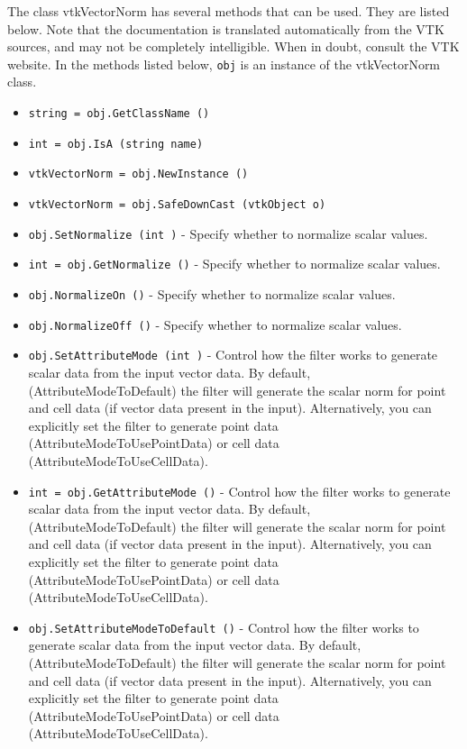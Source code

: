 The class vtkVectorNorm has several methods that can be used.
  They are listed below.
Note that the documentation is translated automatically from the VTK sources,
and may not be completely intelligible.  When in doubt, consult the VTK website.
In the methods listed below, \verb|obj| is an instance of the vtkVectorNorm class.
\begin{itemize}
\item  \verb|string = obj.GetClassName ()|

\item  \verb|int = obj.IsA (string name)|

\item  \verb|vtkVectorNorm = obj.NewInstance ()|

\item  \verb|vtkVectorNorm = obj.SafeDownCast (vtkObject o)|

\item  \verb|obj.SetNormalize (int )| -  Specify whether to normalize scalar values.

\item  \verb|int = obj.GetNormalize ()| -  Specify whether to normalize scalar values.

\item  \verb|obj.NormalizeOn ()| -  Specify whether to normalize scalar values.

\item  \verb|obj.NormalizeOff ()| -  Specify whether to normalize scalar values.

\item  \verb|obj.SetAttributeMode (int )| -  Control how the filter works to generate scalar data from the
 input vector data. By default, (AttributeModeToDefault) the
 filter will generate the scalar norm for point and cell data (if
 vector data present in the input). Alternatively, you can
 explicitly set the filter to generate point data
 (AttributeModeToUsePointData) or cell data
 (AttributeModeToUseCellData).

\item  \verb|int = obj.GetAttributeMode ()| -  Control how the filter works to generate scalar data from the
 input vector data. By default, (AttributeModeToDefault) the
 filter will generate the scalar norm for point and cell data (if
 vector data present in the input). Alternatively, you can
 explicitly set the filter to generate point data
 (AttributeModeToUsePointData) or cell data
 (AttributeModeToUseCellData).

\item  \verb|obj.SetAttributeModeToDefault ()| -  Control how the filter works to generate scalar data from the
 input vector data. By default, (AttributeModeToDefault) the
 filter will generate the scalar norm for point and cell data (if
 vector data present in the input). Alternatively, you can
 explicitly set the filter to generate point data
 (AttributeModeToUsePointData) or cell data
 (AttributeModeToUseCellData).


\end{itemize}
